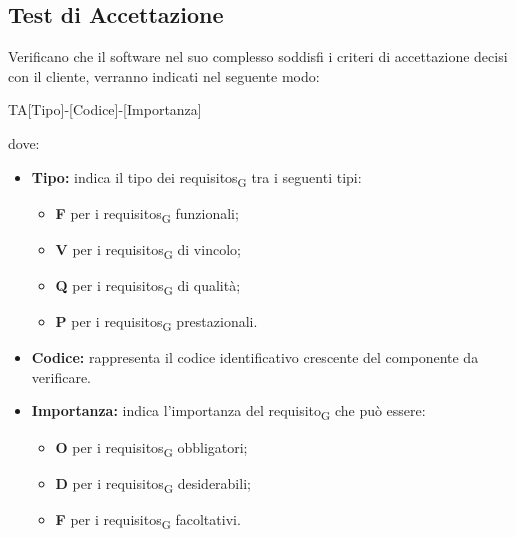 \subsection{Test di Accettazione}
Verificano che il software nel suo complesso soddisfi i criteri di accettazione decisi con il cliente, verranno indicati nel seguente modo:\\
\begin{center}
	TA[Tipo]-[Codice]-[Importanza]\\
\end{center}
dove:
\begin{itemize}
    \item \textbf{Tipo:} indica il tipo dei \glspl{requisito}\textsubscript{G} tra i seguenti tipi:
    \begin{itemize}
        \item \textbf{F} per i \glspl{requisito}\textsubscript{G} funzionali;
        \item \textbf{V} per i \glspl{requisito}\textsubscript{G} di vincolo;
        \item \textbf{Q} per i \glspl{requisito}\textsubscript{G} di qualità;
        \item \textbf{P} per i \glspl{requisito}\textsubscript{G} prestazionali.
    \end{itemize}
	\item \textbf{Codice:} rappresenta il codice identificativo crescente del componente da verificare.
	\item \textbf{Importanza:} indica l'importanza del \gls{requisito}\textsubscript{G} che può essere:
		\begin{itemize}
			\item \textbf{O} per i \glspl{requisito}\textsubscript{G} obbligatori;
			\item \textbf{D} per i \glspl{requisito}\textsubscript{G} desiderabili;
			\item \textbf{F} per i \glspl{requisito}\textsubscript{G} facoltativi.
		\end{itemize}
\end{itemize}

